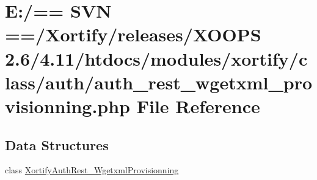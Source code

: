 \hypertarget{auth__rest__wgetxml__provisionning_8php}{\section{E\-:/== S\-V\-N ==/\-Xortify/releases/\-X\-O\-O\-P\-S 2.6/4.11/htdocs/modules/xortify/class/auth/auth\-\_\-rest\-\_\-wgetxml\-\_\-provisionning.php File Reference}
\label{auth__rest__wgetxml__provisionning_8php}
}
\subsection*{Data Structures}
\begin{DoxyCompactItemize}
\item 
class \hyperlink{class_xortify_auth_rest___wgetxml_provisionning}{Xortify\-Auth\-Rest\-\_\-\-Wgetxml\-Provisionning}
\end{DoxyCompactItemize}
